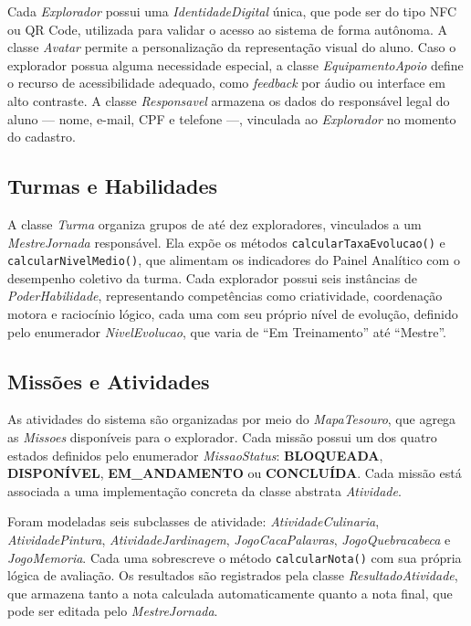 \documentclass[12pt, a4paper]{article}
\begin{document}
Cada \textit{Explorador} possui uma \textit{IdentidadeDigital} única,
que pode ser do tipo NFC ou QR Code, utilizada para validar o acesso
ao sistema de forma autônoma. A classe \textit{Avatar} permite a
personalização da representação visual do aluno. Caso o explorador
possua alguma necessidade especial, a classe \textit{EquipamentoApoio}
define o recurso de acessibilidade adequado, como \textit{feedback}
por áudio ou interface em alto contraste. A classe \textit{Responsavel}
armazena os dados do responsável legal do aluno — nome, e-mail, CPF e
telefone —, vinculada ao \textit{Explorador} no momento do cadastro.

\subsection{Turmas e Habilidades}

A classe \textit{Turma} organiza grupos de até dez exploradores,
vinculados a um \textit{MestreJornada} responsável. Ela expõe os
métodos \texttt{calcularTaxaEvolucao()} e \texttt{calcularNivelMedio()},
que alimentam os indicadores do Painel Analítico com o desempenho
coletivo da turma. Cada explorador possui seis instâncias de
\textit{PoderHabilidade}, representando competências como criatividade,
coordenação motora e raciocínio lógico, cada uma com seu próprio nível
de evolução, definido pelo enumerador \textit{Nivel\-Evolucao}, que varia
de ``Em Treinamento'' até ``Mestre''.

\subsection{Missões e Atividades}

As atividades do sistema são organizadas por meio do
\textit{MapaTesouro}, que agrega as \textit{Missoes} disponíveis
para o explorador. Cada missão possui um dos quatro estados definidos
pelo enumerador \textit{MissaoStatus}: \textbf{BLOQUEADA},
\textbf{DISPONÍVEL}, \textbf{EM\_ANDAMENTO} ou \textbf{CONCLUÍDA}.
Cada missão está associada a uma implementação concreta da
classe abstrata \textit{Atividade}.

Foram modeladas seis subclasses de atividade:
\textit{AtividadeCulinaria}, \textit{AtividadePintura},
\textit{AtividadeJardinagem}, \textit{JogoCacaPalavras},
\textit{JogoQuebracabeca} e \textit{JogoMemoria}. Cada uma
sobrescreve o método \texttt{calcularNota()} com sua própria
lógica de avaliação. Os resultados são registrados pela classe
\textit{ResultadoAtividade}, que armazena tanto a nota calculada
automaticamente quanto a nota final, que pode ser editada pelo
\textit{MestreJornada}.
\end{document}
